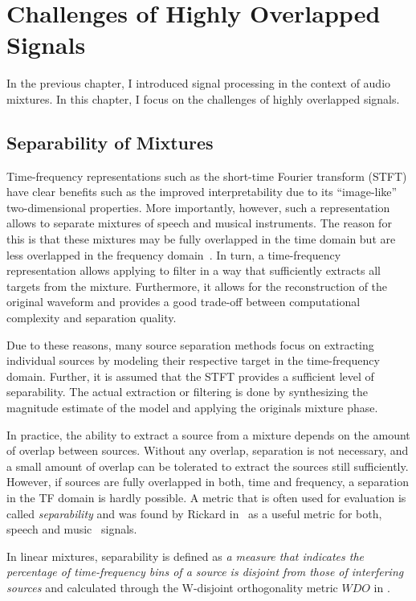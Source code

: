 \hypertarget{highly-overlapped-signals}{%
\chapter{Challenges of Highly Overlapped Signals}\label{cha:highly-overlapped-signals}}

In the previous chapter, I introduced signal processing in the context of audio mixtures. In this chapter, I focus on the challenges of highly overlapped signals.

\hypertarget{separability-of-mixtures}{%
\section{Separability of Mixtures}\label{separability-of-mixtures}}

Time-frequency representations such as the short-time Fourier transform (STFT) have clear benefits such as the improved interpretability due to its ``image-like'' two-dimensional properties.
More importantly, however, such a representation allows to separate mixtures of speech and musical instruments.
The reason for this is that these mixtures may be fully overlapped in the time domain but are less overlapped in the frequency domain~\cite{rickard02, giannoulis11, rafii}.
In turn, a time-frequency representation allows applying to filter in a way that sufficiently extracts all targets from the mixture.
Furthermore, it allows for the reconstruction of the original waveform and provides a good trade-off between computational complexity and separation quality.
\par
Due to these reasons, many source separation methods focus on extracting individual sources by modeling their respective target in the time-frequency domain.
Further, it is assumed that the STFT provides a sufficient level of separability.
The actual extraction or filtering is done by synthesizing the magnitude estimate of the model and applying the originals mixture phase.
\par
In practice, the ability to extract a source from a mixture depends on the amount of overlap between sources.
Without any overlap, separation is not necessary, and a small amount of overlap can be tolerated to extract the sources still sufficiently.
However, if sources are fully overlapped in both, time and frequency, a separation in the TF domain is hardly possible.
A metric that is often used for evaluation is called \emph{separability} and was found by Rickard in~\cite{rickard02} as a useful metric for both, speech and music~\cite{giannoulis11} signals.
\par
In linear mixtures, separability is defined as \emph{a measure that indicates the percentage of time-frequency bins of a source is disjoint from those of interfering sources} and calculated through the W-disjoint orthogonality metric \(WDO\) in \cite{rickard02}.

